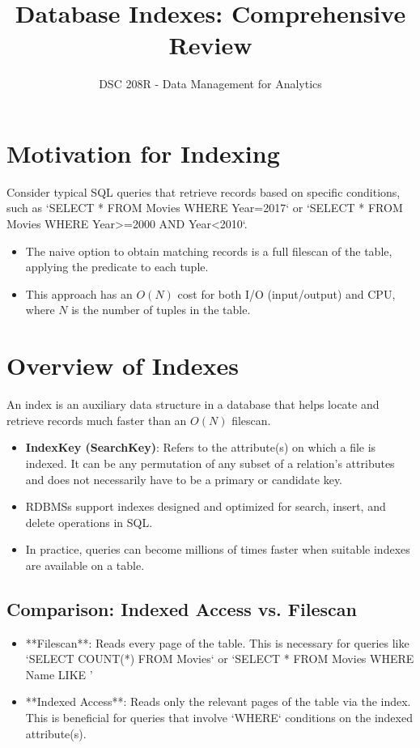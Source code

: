 \documentclass{article}
\title{Database Indexes: Comprehensive Review}
\author{DSC 208R - Data Management for Analytics}
\date{}
\begin{document}
\maketitle

\section*{Motivation for Indexing}
Consider typical SQL queries that retrieve records based on specific conditions, such as `SELECT * FROM Movies WHERE Year=2017` or `SELECT * FROM Movies WHERE Year>=2000 AND Year<2010`.
\begin{itemize}
    \item The naive option to obtain matching records is a full filescan of the table, applying the predicate to each tuple.
    \item This approach has an $O(N)$ cost for both I/O (input/output) and CPU, where $N$ is the number of tuples in the table.
\end{itemize}

\section*{Overview of Indexes}
An index is an auxiliary data structure in a database that helps locate and retrieve records much faster than an $O(N)$ filescan.
\begin{itemize}
    \item \textbf{IndexKey (SearchKey)}: Refers to the attribute(s) on which a file is indexed. It can be any permutation of any subset of a relation's attributes and does not necessarily have to be a primary or candidate key.
    \item RDBMSs support indexes designed and optimized for search, insert, and delete operations in SQL.
    \item In practice, queries can become millions of times faster when suitable indexes are available on a table.
\end{itemize}

\subsection*{Comparison: Indexed Access vs. Filescan}
\begin{itemize}
    \item **Filescan**: Reads every page of the table. This is necessary for queries like `SELECT COUNT(*) FROM Movies` or `SELECT * FROM Movies WHERE Name LIKE '%
    \item **Indexed Access**: Reads only the relevant pages of the table via the index. This is beneficial for queries that involve `WHERE` conditions on the indexed attribute(s).
\end{itemize}
\end{document}
